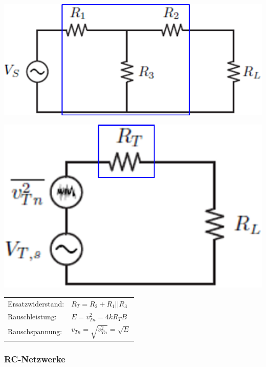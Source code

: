 \begin{minipage}[c]{0.28\columnwidth}
    \includegraphics[width=\columnwidth]{images/gesamte_rauschspannung_schaltung.png}
\end{minipage}
\begin{minipage}[c]{0.22\columnwidth}
    \includegraphics[width=\columnwidth]{images/gesamte_rauschspannung_ersatzschaltung.png}
\end{minipage}
\hfill
\begin{minipage}[c]{0.48\columnwidth}
    \renewcommand{\arraystretch}{1.4}
    \begin{tabular}{@{}ll@{}}
        Ersatzwiderstand:   & $R_T = R_2 + R_1 || R_3$              \\
        Rauschleistung:     & $E = v^2_{Tn} = 4 k R_T B $           \\
        Rauschspannung:     & $v_{Tn} = \sqrt{v^2_{Tn}} = \sqrt{E}$
    \end{tabular}
    \renewcommand{\arraystretch}{1}
\end{minipage}


\subsubsection{RC-Netzwerke}

